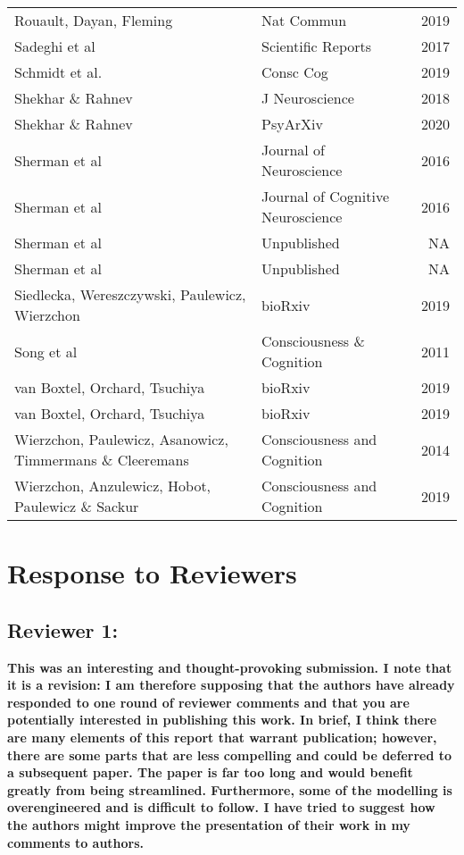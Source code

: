\documentclass[
]{article}
\begin{document}
\begin{longtable}[t]{llr}
Rouault, Dayan, Fleming & Nat Commun & 2019\\
Sadeghi et al & Scientific Reports & 2017\\
Schmidt et al. & Consc Cog & 2019\\
Shekhar \& Rahnev & J Neuroscience & 2018\\
\addlinespace
Shekhar \& Rahnev & PsyArXiv & 2020\\
Sherman et al & Journal of Neuroscience & 2016\\
Sherman et al & Journal of Cognitive Neuroscience & 2016\\
Sherman et al & Unpublished & NA\\
Sherman et al & Unpublished & NA\\
\addlinespace
Siedlecka, Wereszczywski, Paulewicz, Wierzchon & bioRxiv & 2019\\
Song et al & Consciousness \& Cognition & 2011\\
van Boxtel, Orchard, Tsuchiya & bioRxiv & 2019\\
van Boxtel, Orchard, Tsuchiya & bioRxiv & 2019\\
Wierzchon, Paulewicz, Asanowicz, Timmermans \& Cleeremans & Consciousness and Cognition & 2014\\
\addlinespace
Wierzchon, Anzulewicz, Hobot, Paulewicz \& Sackur & Consciousness and Cognition & 2019\\*
\end{longtable}
\endgroup{}

\newpage

\hypertarget{response-to-reviewers}{%
\section{Response to Reviewers}\label{response-to-reviewers}}

\hypertarget{reviewer-1}{%
\subsection{Reviewer 1:}\label{reviewer-1}}

\textbf{This was an interesting and thought-provoking submission. I note
that it is a revision: I am therefore supposing that the authors have
already responded to one round of reviewer comments and that you are
potentially interested in publishing this work. In brief, I think there
are many elements of this report that warrant publication; however,
there are some parts that are less compelling and could be deferred to a
subsequent paper. The paper is far too long and would benefit greatly
from being streamlined. Furthermore, some of the modelling is
overengineered and is difficult to follow. I have tried to suggest how
the authors might improve the presentation of their work in my comments
to authors.}
\end{document}
